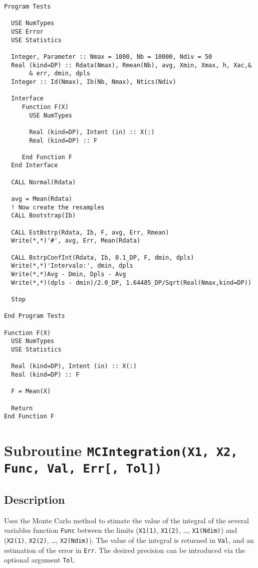 \begin{lstlisting}[emph=BstrpConfInt,
                   emphstyle=\color{blue},
                   frame=trBL,
                   caption=Giving a confidence interval.,
                   label=BstrpConfInt]
Program Tests

  USE NumTypes
  USE Error
  USE Statistics

  Integer, Parameter :: Nmax = 1000, Nb = 10000, Ndiv = 50
  Real (kind=DP) :: Rdata(Nmax), Rmean(Nb), avg, Xmin, Xmax, h, Xac,&
       & err, dmin, dpls
  Integer :: Id(Nmax), Ib(Nb, Nmax), Ntics(Ndiv)

  Interface 
     Function F(X)
       USE NumTypes
         
       Real (kind=DP), Intent (in) :: X(:)
       Real (kind=DP) :: F
       
     End Function F
  End Interface
  
  CALL Normal(Rdata)

  avg = Mean(Rdata)
  ! Now create the resamples
  CALL Bootstrap(Ib)

  CALL EstBstrp(Rdata, Ib, F, avg, Err, Rmean)
  Write(*,*)'#', avg, Err, Mean(Rdata)

  CALL BstrpConfInt(Rdata, Ib, 0.1_DP, F, dmin, dpls)
  Write(*,*)'Intervalo:', dmin, dpls
  Write(*,*)Avg - Dmin, Dpls - Avg
  Write(*,*)(dpls - dmin)/2.0_DP, 1.64485_DP/Sqrt(Real(Nmax,kind=DP))

  Stop

End Program Tests

Function F(X)
  USE NumTypes
  USE Statistics
  
  Real (kind=DP), Intent (in) :: X(:)
  Real (kind=DP) :: F

  F = Mean(X)
  
  Return
End Function F
\end{lstlisting}

\section{Subroutine \texttt{MCIntegration(X1, X2, Func, Val, Err[, Tol])}}

\subsection{Description}

Uses the Monte Carlo method to stimate the value of the integral of
the several variables function \texttt{Func} between the limits
(\texttt{X1(1)}, \texttt{X1(2)}, \dots, \texttt{X1(Ndim)}) and 
(\texttt{X2(1)}, \texttt{X2(2)}, \dots, \texttt{X2(Ndim)}). The value
of the integral is returned in \texttt{Val}, and an estimation of the
error in \texttt{Err}. The desired precision can be introduced via the
optional argument \texttt{Tol}.


